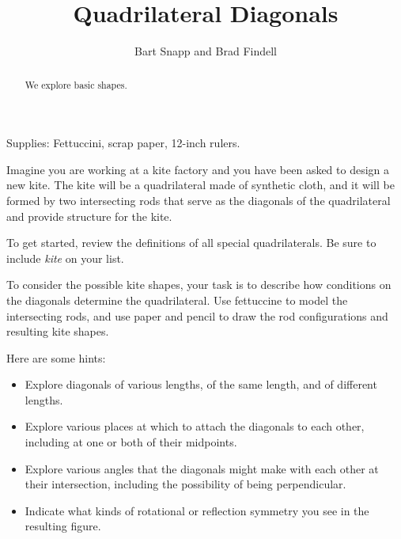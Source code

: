 \documentclass[nooutcomes]{ximera}
\title{Quadrilateral Diagonals}
\author{Bart Snapp and Brad Findell}
\begin{document}
\begin{abstract}
  We explore basic shapes.
\end{abstract}
\maketitle 

\begin{teachingnote}
Supplies:  Fettuccini, scrap paper, 12-inch rulers.
\end{teachingnote}

Imagine you are working at a kite factory and you have been asked to design a new kite.  The kite will be a quadrilateral made of synthetic cloth, and it will be formed by two intersecting rods that serve as the diagonals of the quadrilateral and provide structure for the kite.  

\begin{problem}
To get started, review the definitions of all special quadrilaterals.  Be sure to include \emph{kite} on your list.  
\end{problem}

\begin{problem}
To consider the possible kite shapes, your task is to describe how conditions on the diagonals determine the quadrilateral.  Use fettuccine to model the intersecting rods, and use paper and pencil to draw the rod configurations and resulting kite shapes.  

Here are some hints:  

\begin{itemize}
\item Explore diagonals of various lengths, of the same length, and of different lengths.  
\item Explore various places at which to attach the diagonals to each other, including at one or both of their midpoints.  
\item Explore various angles that the diagonals might make with each other at their intersection, including the possibility of being perpendicular.  
\item Indicate what kinds of rotational or reflection symmetry you see in the resulting figure.
\end{itemize}
\end{problem}
\end{document}
